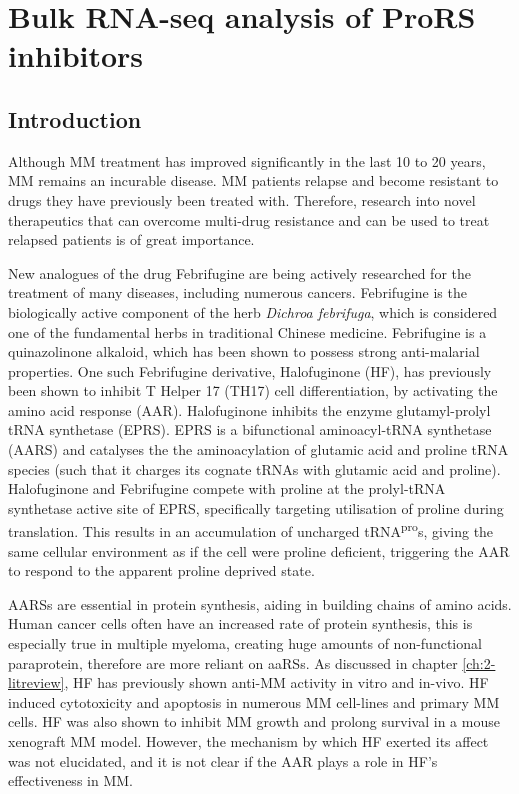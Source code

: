 \chapter{\label{ch:5-bulk}Bulk RNA-seq analysis of ProRS inhibitors}


\section{Introduction}
Although MM treatment has improved significantly in the last 10 to 20 years, MM remains an incurable disease.
MM patients relapse and become resistant to drugs they have previously been treated with.
Therefore, research into novel therapeutics that can overcome multi-drug resistance and can be used to treat relapsed patients is of great importance.

New analogues of the drug Febrifugine are being actively researched for the treatment of many diseases, including numerous cancers.
Febrifugine is the biologically active component of the herb \textit{Dichroa febrifuga}, which is considered one of the fundamental herbs in traditional Chinese medicine.
Febrifugine is a quinazolinone alkaloid, which has been shown to possess strong anti-malarial properties.
One such Febrifugine derivative, Halofuginone (HF), has previously been shown to inhibit T Helper 17 (TH17) cell differentiation, by activating the amino acid response (AAR)\cite{sundrud2009halofuginone}.
Halofuginone inhibits the enzyme glutamyl-prolyl tRNA synthetase (EPRS).
EPRS is a bifunctional aminoacyl-tRNA synthetase (AARS) and catalyses the the aminoacylation of glutamic acid and proline tRNA species (such that it charges its cognate tRNAs with glutamic acid and proline).
Halofuginone and Febrifugine compete with proline at the prolyl-tRNA synthetase active site of EPRS, specifically targeting utilisation of proline during translation\cite{keller2012halofuginone}.
This results in an accumulation of uncharged tRNA\textsuperscript{pro}s, giving the same cellular environment as if the cell were proline deficient, triggering the AAR to respond to the apparent proline deprived state.

AARSs are essential in protein synthesis, aiding in building chains of amino acids.
Human cancer cells often have an increased rate of protein synthesis, this is especially true in multiple myeloma, creating huge amounts of non-functional paraprotein, therefore are more reliant on aaRSs.
As discussed in chapter \ref{ch:2-litreview}, HF has previously shown anti-MM activity in vitro and in-vivo.
HF induced cytotoxicity and apoptosis in numerous MM cell-lines and primary MM cells.
HF was also shown to inhibit MM growth and prolong survival in a mouse xenograft MM model.
However, the mechanism by which HF exerted its affect was not elucidated, and it is not clear if the AAR plays a role in HF's effectiveness in MM\@.

